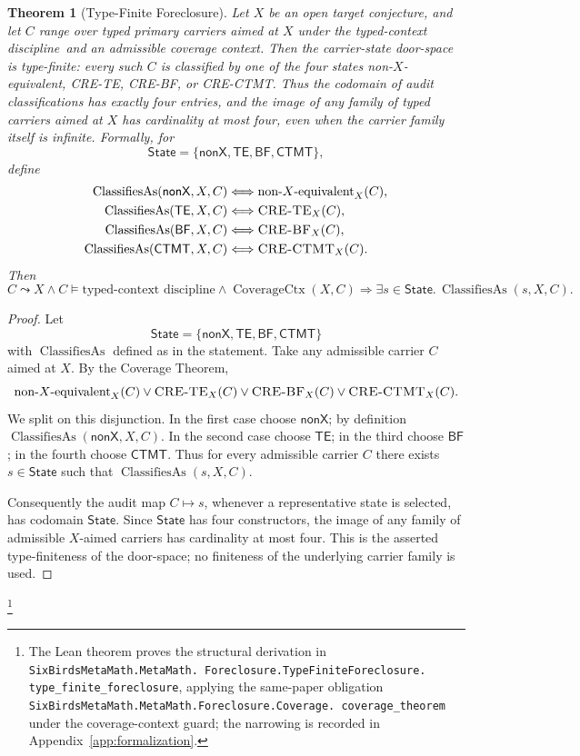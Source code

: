 \documentclass[11pt]{article}
\newcommand{\nonXequiv}{non-$X$-equivalent}
\newcommand{\CRETE}{\textsc{CRE-TE}}
\newcommand{\CREBF}{\textsc{CRE-BF}}
\newcommand{\CRECTMT}{\textsc{CRE-CTMT}}
\newcommand{\TCD}{typed-context discipline}
\newtheorem{theorem}{Theorem}[section]
\theoremstyle{definition}
\begin{document}
\begin{theorem}[Type-Finite Foreclosure]\label{thm:type-finite-foreclosure}
Let \(X\) be an open target conjecture, and let \(C\) range over typed
primary carriers aimed at \(X\) under the \TCD\ and an admissible
coverage context.  Then the carrier-state door-space is type-finite:
every such \(C\) is classified by one of the four states
\nonXequiv, \textup{\CRETE}, \textup{\CREBF}, or \textup{\CRECTMT}.
Thus the codomain of audit classifications has exactly four entries,
and the image of any family of typed carriers aimed at \(X\) has
cardinality at most four, even when the carrier family itself is
infinite.
Formally, for
\[
  \mathsf{State}
  =\{\mathsf{nonX},\mathsf{TE},\mathsf{BF},\mathsf{CTMT}\},
\]
define
\[
\begin{aligned}
  \operatorname{ClassifiesAs}(\mathsf{nonX},X,C)
    &\Longleftrightarrow \mbox{\nonXequiv}_X(C),\\
  \operatorname{ClassifiesAs}(\mathsf{TE},X,C)
    &\Longleftrightarrow \mbox{\CRETE}_X(C),\\
  \operatorname{ClassifiesAs}(\mathsf{BF},X,C)
    &\Longleftrightarrow \mbox{\CREBF}_X(C),\\
  \operatorname{ClassifiesAs}(\mathsf{CTMT},X,C)
    &\Longleftrightarrow \mbox{\CRECTMT}_X(C).
\end{aligned}
\]
Then
\[
  C\leadsto X\wedge C\models\text{\TCD}\wedge
  \operatorname{CoverageCtx}(X,C)
  \Longrightarrow
  \exists s\in\mathsf{State}.\,
    \operatorname{ClassifiesAs}(s,X,C).
\]
\end{theorem}

\begin{proof}
Let
\[
  \mathsf{State}
  =\{\mathsf{nonX},\mathsf{TE},\mathsf{BF},\mathsf{CTMT}\}
\]
with \(\operatorname{ClassifiesAs}\) defined as in the statement.
Take any admissible carrier \(C\) aimed at \(X\).  By the Coverage
Theorem,
\[
  \mbox{\nonXequiv}_X(C)\vee
  \mbox{\CRETE}_X(C)\vee
  \mbox{\CREBF}_X(C)\vee
  \mbox{\CRECTMT}_X(C).
\]
We split on this disjunction.  In the first case choose
\(\mathsf{nonX}\); by definition
\(\operatorname{ClassifiesAs}(\mathsf{nonX},X,C)\).  In the second
case choose \(\mathsf{TE}\); in the third choose \(\mathsf{BF}\); in
the fourth choose \(\mathsf{CTMT}\).  Thus for every admissible
carrier \(C\) there exists \(s\in\mathsf{State}\) such that
\(\operatorname{ClassifiesAs}(s,X,C)\).

Consequently the audit map \(C\mapsto s\), whenever a representative
state is selected, has codomain \(\mathsf{State}\).  Since
\(\mathsf{State}\) has four constructors, the image of any family of
admissible \(X\)-aimed carriers has cardinality at most four.  This is
the asserted type-finiteness of the door-space; no finiteness of the
underlying carrier family is used.
\end{proof}\footnote{\raggedright The Lean theorem proves the structural
derivation in \texttt{SixBirdsMetaMath.MetaMath.\allowbreak
Foreclosure.TypeFiniteForeclosure.\allowbreak
type\_finite\_foreclosure}, applying the same-paper obligation
\texttt{SixBirdsMetaMath.MetaMath.\allowbreak Foreclosure.Coverage.\allowbreak
coverage\_theorem} under the coverage-context guard; the narrowing is
recorded in Appendix~\ref{app:formalization}.}
\end{document}
